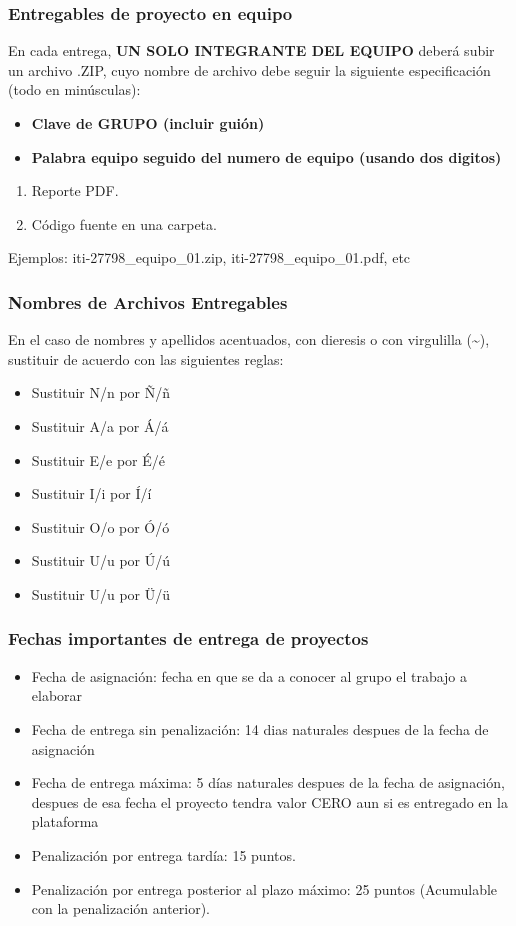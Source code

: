 \documentclass[aspectratio=169]{beamer}
\begin{document}
\begin{frame}
\frametitle{Entregables de proyecto en equipo}
En cada entrega, \textbf{UN SOLO INTEGRANTE DEL EQUIPO} deberá subir un archivo .ZIP, cuyo nombre de archivo debe seguir la siguiente especificación (todo en minúsculas):
\begin{itemize}
\item \textbf{Clave de GRUPO (incluir guión)}
\item \textbf{Palabra equipo seguido del numero de equipo (usando dos digitos)}
\end{itemize}

\begin{enumerate}
\item Reporte PDF.
\item Código fuente en una carpeta.
\end{enumerate}
Ejemplos: iti-27798\_equipo\_01.zip, iti-27798\_equipo\_01.pdf, etc
\end{frame}

\begin{frame}
\frametitle{Nombres de Archivos Entregables}
En el caso de nombres y apellidos acentuados, con dieresis o con virgulilla (\textasciitilde{}), sustituir de acuerdo con las siguientes reglas:
\begin{itemize}
\item Sustituir N/n por \~N/\~n
\item Sustituir A/a por \'A/\'a
\item Sustituir E/e por \'E/\'e
\item Sustituir I/i por \'I/\'i
\item Sustituir O/o por \'O/\'o
\item Sustituir U/u por \'U/\'u
\item Sustituir U/u por \"U/\"u
\end{itemize}
\end{frame}




\begin{frame}
\frametitle{Fechas importantes de entrega de proyectos}

\begin{itemize}
\item Fecha de asignación: fecha en que se da a conocer al grupo el trabajo a elaborar
\item Fecha de entrega sin penalización: 14 dias naturales despues de la fecha de asignación
\item Fecha de entrega máxima: 5 días naturales despues de la fecha de asignación, despues de esa fecha el proyecto tendra valor CERO aun si es entregado en la plataforma
\item Penalización por entrega tardía: 15 puntos.
\item Penalización por entrega posterior al plazo máximo: 25 puntos  (Acumulable con la penalización anterior).
\end{itemize}
\end{frame}
\end{document}

